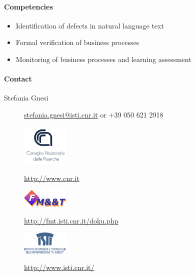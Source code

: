 \documentclass{learnpad}
\begin{document}
\paragraph{Competencies}
\begin{itemize}
	\item Identification of defects in natural language text
	\item Formal verification of business processes
	\item Monitoring of business processes and learning assessment
\end{itemize}

\paragraph{Contact}
\begin{description}
	\item[Stefania Gnesi] \href{mailto:stefania.gnesi@isti.cnr.it}{stefania.gnesi@isti.cnr.it} or +39 050 621 2918
\end{description}

\begin{figure}[!htp]
	\centering
	\includegraphics[width=6em,keepaspectratio]{figures/cnr.png}\par
	\url{http://www.cnr.it}
\end{figure}

\begin{figure}[!htp]
	\centering
	\includegraphics[width=6em,keepaspectratio]{figures/fmt.png}\par
	\url{http://fmt.isti.cnr.it/doku.php}
\end{figure}

\begin{figure}[!htp]
	\centering
	\includegraphics[width=6em,keepaspectratio]{figures/isti.png}\par
	\url{http://www.isti.cnr.it/}
\end{figure}
\end{document}
